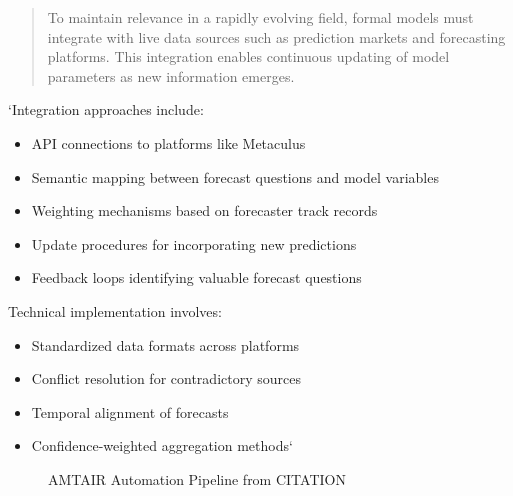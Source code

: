 \documentclass[]{book}
\providecommand{\tightlist}{%
  \setlength{\itemsep}{0pt}\setlength{\parskip}{0pt}}
\begin{document}
\begin{quote}
To maintain relevance in a rapidly evolving field, formal models must
integrate with live data sources such as prediction markets and
forecasting platforms. This integration enables continuous updating of
model parameters as new information emerges.
\end{quote}

`Integration approaches include:

\begin{itemize}
\tightlist
\item
  API connections to platforms like Metaculus
\item
  Semantic mapping between forecast questions and model variables
\item
  Weighting mechanisms based on forecaster track records
\item
  Update procedures for incorporating new predictions
\item
  Feedback loops identifying valuable forecast questions
\end{itemize}

Technical implementation involves:

\begin{itemize}
\tightlist
\item
  Standardized data formats across platforms
\item
  Conflict resolution for contradictory sources
\item
  Temporal alignment of forecasts
\item
  Confidence-weighted aggregation methods`
\end{itemize}

\begin{figure}


\caption[Five-step AMTAIR automation pipeline from PDFs to Bayesian
networks]{\label{fig-automation_pipeline}AMTAIR Automation Pipeline from
CITATION}

\end{figure}%
\end{document}
